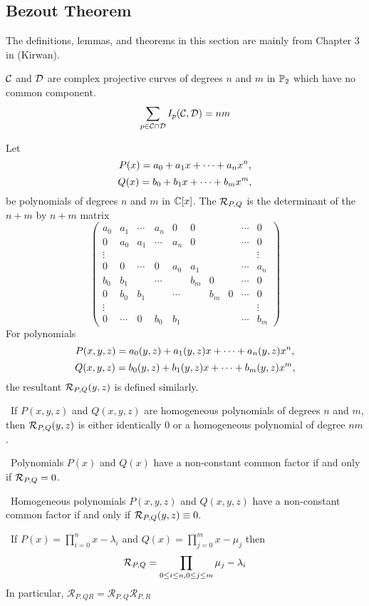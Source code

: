 \subsection{Bezout Theorem}

The definitions, lemmas, and theorems in this section are mainly from Chapter 3 in \cite{ref:kirwan} (Kirwan).

\begin{theorem}[Bezout]\label{thm:bezout}
    $\mathcal C$ and $\mathcal D$ are complex projective curves of degrees $n$ and $m$ in $\mathbb P_2$ which have no common component. $$\sum_{p\in \mathcal C\cap\mathcal D}I_p(\mathcal C,\mathcal D)=nm$$
\end{theorem}

\begin{definition}[resultant]
    Let $$P(x)=a_0+a_1x+\cdots+a_nx^n,$$ $$Q(x)=b_0+b_1x+\cdots+b_mx^m,$$ be polynomials of degrees $n$ and $m$ in $\mathbb C[x]$. The  $\mathcal R_{P,Q}$ is the determinant of the $n+m$ by $n+m$ matrix
    $$
    \begin{pmatrix}
        a_0 & a_1 & \cdots & a_n & 0 & 0 & & & \cdots & 0 \\
        0 & a_0 & a_1 & \cdots & a_n & 0 & & & \cdots & 0 \\
        \vdots & & & & & & & & & \vdots \\
        0 & 0 & \cdots & 0 & a_0 & a_1 & & & \cdots & a_n \\
        b_0 & b_1 & & \cdots & & b_m & 0 & & \cdots & 0 \\
        0 & b_0 & b_1 & & \cdots & & b_m & 0 & \cdots & 0 \\
        \vdots & & & & & & & & & \vdots \\
        0 & \cdots & 0 & b_0 & b_1 & & & & \cdots & b_m
    \end{pmatrix}
    $$
    For polynomials $$P(x,y,z)=a_0(y,z)+a_1(y,z)x+\cdots+a_n(y,z)x^n,$$ $$Q(x,y,z)=b_0(y,z)+b_1(y,z)x+\cdots+b_m(y,z)x^m,$$ the resultant $\mathcal R_{P,Q}(y,z)$ is defined similarly.
\end{definition}

\begin{observation}\label{obs:respq}
    \textbullet\ If $P(x,y,z)$ and $Q(x,y,z)$ are homogeneous polynomials of degrees $n$ and $m$, then $\mathcal R_{P,Q}(y,z)$ is either identically 0 or a homogeneous polynomial of degree $nm$.
    
    \textbullet\ Polynomials $P(x)$ and $Q(x)$ have a non-constant common factor if and only if $\mathcal R_{P,Q}=0$.
    
    \textbullet\ Homogeneous polynomials $P(x,y,z)$ and $Q(x,y,z)$ have a non-constant common factor if and only if $\mathcal R_{P,Q}(y,z)\equiv 0$.

    \textbullet\ If $P(x)=\prod_{i=0}^{n}x-\lambda_i$ and $Q(x)=\prod_{j=0}^{m}x-\mu_j$ then $$\mathcal R_{P,Q}=\prod_{0\leq i\leq n,0\leq j\leq m}\mu_j-\lambda_i$$
    In particular, $\mathcal{R}_{P,QR}=\mathcal{R}_{P,Q}\mathcal{R}_{P,R}$
\end{observation}

